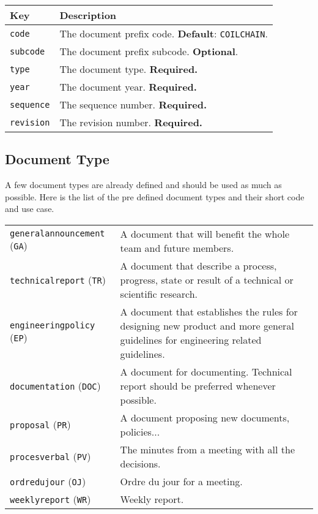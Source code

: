 \documentclass[technicalreport]{coilchain}
\begin{document}
\begin{tabular}{|l|l|}\hline
    \textbf{Key} & \textbf{Description} \\\hline

    \texttt{code} 
    & The document prefix code. \textbf{Default}: \texttt{COILCHAIN}.\\\hline
    
    \texttt{subcode} 
    & The document prefix subcode. \textbf{Optional}.\\\hline

    \texttt{type} 
    & The document type. \textbf{Required.}\\\hline
    
    
    \texttt{year} 
    & The document year. \textbf{Required.}\\\hline
    
    \texttt{sequence} 
    & The sequence number. \textbf{Required.}\\\hline

    \texttt{revision} 
    & The revision number. \textbf{Required.}\\\hline
\end{tabular}

\subsection{Document Type}\label{sec:doctype}
A few document types are already defined and should be used as much as 
possible.
Here is the list of the pre defined document types and their short code and use 
case.

\begin{tabularx}{\textwidth}{lX}
	\texttt{generalannouncement} (\texttt{GA}) & A document that will benefit 
	the whole 
	team and future members. \\
	\texttt{technicalreport} (\texttt{TR}) & A document that describe a process,
	progress, state or result of a technical or scientific research. \\
	\texttt{engineeringpolicy} (\texttt{EP}) & A document that establishes the 
	rules for designing new product and more general guidelines for engineering 
	related guidelines. \\
	\texttt{documentation} (\texttt{DOC}) & A document for documenting. 
	Technical report should be preferred whenever possible. \\
	\texttt{proposal} (\texttt{PR}) & A document proposing new documents, 
	policies...\\
	\texttt{procesverbal} (\texttt{PV}) & The minutes from a meeting with all 
	the decisions.\\
	\texttt{ordredujour} (\texttt{OJ}) & Ordre du jour for a meeting.\\
   	\texttt{weeklyreport} (\texttt{WR}) & Weekly report.
\end{tabularx}
\end{document}
